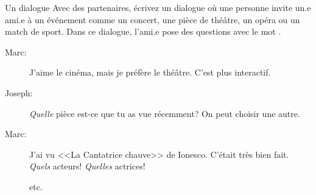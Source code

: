 \begin{frame}{Un dialogue}
  Avec des partenaires, écrivez un dialogue où une personne invite un.e ami.e à un événement comme un concert, une pièce de théâtre, un opéra ou un match de sport.
  Dans ce dialogue, l'ami.e pose des questions avec le mot .
  \begin{description}
    \item[Marc:] J'aime le cinéma, mais je préfère le théâtre. C'est plus interactif.
    \item[Joseph:] \emph{Quelle} pièce est-ce que tu as vue récemment? On peut choisir une autre.
    \item[Marc:] J'ai vu <<La Cantatrice chauve>> de Ionesco. C'était très bien fait. \emph{Quels} acteurs! \emph{Quelles} actrices!
    \item[] etc.
  \end{description}
\end{frame}
